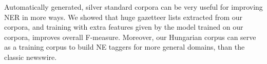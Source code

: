\documentclass[11pt]{article}
\begin{document}
Automatically generated, silver standard corpora can be very useful for improving NER in more ways. We showed that huge gazetteer lists extracted from our corpora, and training with extra features given by the model trained on our corpora, improves overall F-measure. Moreover, our Hungarian corpus can serve as a training corpus to build NE taggers for more general domains, than the classic newswire.  




\end{document}
